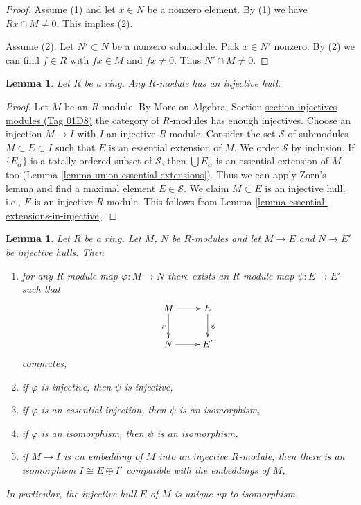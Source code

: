 \documentclass{amsart}
\theoremstyle{plain}
\newtheorem{lemma}[subsection]{Lemma}
\theoremstyle{definition}
\theoremstyle{remark}
\numberwithin{equation}{subsection}
\begin{document}
\begin{proof}
Assume (1) and let $x \in N$ be a nonzero element. By (1) we have
$Rx \cap M \not = 0$. This implies (2).

\medskip\noindent
Assume (2). Let $N' \subset N$ be a nonzero submodule. Pick $x \in N'$
nonzero. By (2) we can find $f \in R$ with $fx \in M$ and $fx \not = 0$.
Thus $N' \cap M \not = 0$.
\end{proof}


\begin{lemma}
\label{lemma-injective-hull}
Let $R$ be a ring. Any $R$-module has an injective hull.
\end{lemma}

\begin{proof}
Let $M$ be an $R$-module. By
More on Algebra, Section \href{https://stacks.math.columbia.edu/tag/01D8}{section injectives modules (Tag 01D8)}
the category of $R$-modules has enough injectives.
Choose an injection $M \to I$ with $I$ an injective $R$-module.
Consider the set $\mathcal{S}$ of submodules $M \subset E \subset I$
such that $E$ is an essential extension of $M$. We order $\mathcal{S}$
by inclusion. If $\{E_\alpha\}$ is a totally ordered subset
of $\mathcal{S}$, then $\bigcup E_\alpha$ is an essential extension of $M$
too (Lemma \ref{lemma-union-essential-extensions}).
Thus we can apply Zorn's lemma and find a maximal element
$E \in \mathcal{S}$. We claim $M \subset E$ is an injective hull, i.e.,
$E$ is an injective $R$-module. This follows from
Lemma \ref{lemma-essential-extensions-in-injective}.
\end{proof}


\begin{lemma}
\label{lemma-injective-hull-unique}
Let $R$ be a ring. Let $M$, $N$ be $R$-modules and let $M \to E$
and $N \to E'$ be injective hulls. Then
\begin{enumerate}
\item for any $R$-module map $\varphi : M \to N$ there exists an
$R$-module map $\psi : E \to E'$ such that
$$
\xymatrix{
M \ar[r] \ar[d]_\varphi & E \ar[d]^\psi \\
N \ar[r] & E'
}
$$
commutes,
\item if $\varphi$ is injective, then $\psi$ is injective,
\item if $\varphi$ is an essential injection, then $\psi$ is an isomorphism,
\item if $\varphi$ is an isomorphism, then $\psi$ is an isomorphism,
\item if $M \to I$ is an embedding of $M$ into an injective $R$-module,
then there is an isomorphism $I \cong E \oplus I'$ compatible with
the embeddings of $M$,
\end{enumerate}
In particular, the injective hull $E$ of $M$ is unique up to isomorphism.
\end{lemma}
\end{document}
